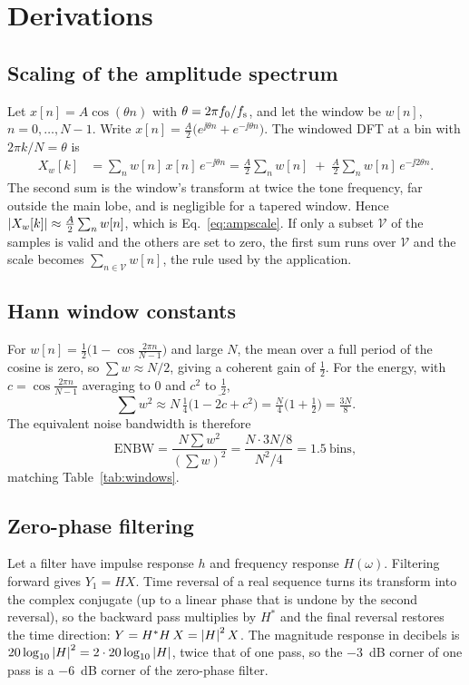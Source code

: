 \chapter{Derivations}\label{app:deriv}

\section{Scaling of the amplitude spectrum}\label{app:scale}
Let $x[n]=A\cos(\theta n)$ with $\theta=2\pi f_0/f_{\mathrm{s}}$, and let the window be $w[n]$, $n=0,\dots,N-1$. Write
$x[n]=\tfrac A2\bigl(e^{\jj\theta n}+e^{-\jj\theta n}\bigr)$. The windowed DFT at a bin with $2\pi k/N=\theta$ is
\begin{align}
  X_w[k] &= \sum_{n}w[n]\,x[n]\,e^{-\jj\theta n}
  = \frac A2\sum_{n}w[n]\;+\;\frac A2\sum_{n}w[n]\,e^{-\jj2\theta n}.
\end{align}
The second sum is the window's transform at twice the tone frequency, far outside the main lobe, and is negligible for a
tapered window. Hence $\left|X_w[k]\right|\approx\tfrac A2\sum_nw[n]$, which is Eq.~\eqref{eq:ampscale}. If only a subset
$\mathcal V$ of the samples is valid and the others are set to zero, the first sum runs over $\mathcal V$ and the scale becomes
$\sum_{n\in\mathcal V}w[n]$, the rule used by the application.

\section{Hann window constants}\label{app:hann}
For $w[n]=\tfrac12\bigl(1-\cos\frac{2\pi n}{N-1}\bigr)$ and large $N$, the mean over a full period of the cosine is zero, so
$\sum w\approx N/2$, giving a coherent gain of $\tfrac12$. For the energy, with $c=\cos\frac{2\pi n}{N-1}$ averaging to 0 and $c^2$ to $\tfrac12$,
\[
  \sum w^2\approx N\,\overline{\tfrac14\bigl(1-2c+c^{2}\bigr)}=\tfrac N4\bigl(1+\tfrac12\bigr)=\tfrac{3N}{8}.
\]
The equivalent noise bandwidth is therefore
\[
  \mathrm{ENBW}=\frac{N\sum w^2}{(\sum w)^2}=\frac{N\cdot 3N/8}{N^2/4}=1.5\ \text{bins},
\]
matching Table~\ref{tab:windows}.

\section{Zero-phase filtering}\label{app:zp}
Let a filter have impulse response $h$ and frequency response $H(\omega)$. Filtering forward gives $Y_1=H X$. Time reversal of a real
sequence turns its transform into the complex conjugate (up to a linear phase that is undone by the second reversal), so the
backward pass multiplies by $H^{*}$ and the final reversal restores the time direction: $Y=H^{*}H\,X=\left|H\right|^{2}X$. The
magnitude response in decibels is $20\log_{10}\left|H\right|^{2}=2\cdot20\log_{10}\left|H\right|$, twice that of one pass, so the $-3$~dB corner of one
pass is a $-6$~dB corner of the zero-phase filter.

